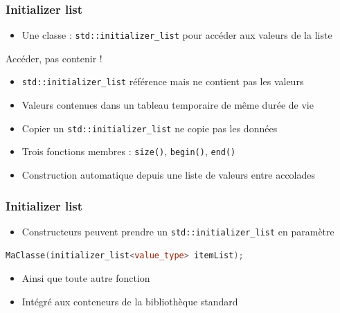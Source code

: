 \documentclass[C++.tex]{subfiles}
\begin{document}
\begin{frame}[fragile]
	\frametitle{Initializer list}
	\begin{itemize}
		\item Une classe : \lstinline|std::initializer_list| pour accéder aux valeurs de la liste
	\end{itemize}

	\begin{alertblock}{Accéder, pas contenir !}
		\begin{itemize}
			\item \lstinline|std::initializer_list| référence mais ne contient pas les valeurs
			\item Valeurs contenues dans un tableau temporaire de même durée de vie
			\item Copier un \lstinline|std::initializer_list| ne copie pas les données
		\end{itemize}
	\end{alertblock}		

	\begin{itemize}
		\item Trois fonctions membres : \lstinline|size()|, \lstinline|begin()|, \lstinline|end()|
		\item Construction automatique depuis une liste de valeurs entre accolades
	\end{itemize}
\end{frame}

\begin{frame}[fragile]
	\frametitle{Initializer list}
	\begin{itemize}
		\item Constructeurs peuvent prendre un \lstinline|std::initializer_list| en paramètre
	\end{itemize}

	\begin{lstlisting}[language=C++]
MaClasse(initializer_list<value_type> itemList);\end{lstlisting}

	\begin{itemize}
		\item Ainsi que toute autre fonction
		\item Intégré aux conteneurs de la bibliothèque standard
	\end{itemize}
\end{frame}
\end{document}
